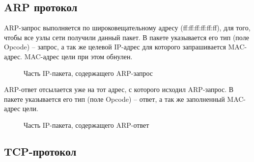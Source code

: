 \documentclass[a4paper, 14pt,russian]{article}
\begin{document}
\subsection{ARP протокол}
ARP-запрос выполняется по широковещательному адресу (ff:ff:ff:ff:ff:ff), для того, чтобы все узлы сети получили данный пакет. В пакете указывается его тип (поле Opcode) – запрос, а так же целевой IP-адрес для которого запрашивается MAC-адрес. MAC-адрес цели при этом обнулен.
\begin{figure}[h!]
	\caption{Часть IP-пакета, содержащего ARP-запрос}
	\label{img:arp_req}
\end{figure}

\newpage
ARP-ответ отсылается уже на тот адрес, с которого исходил ARP-запрос. В пакете указывается его тип (поле Opcode) – ответ, а так же заполненный MAC-адрес цели.
\begin{figure}[h!]
	\caption{Часть IP-пакета, содержащего ARP-ответ}
	\label{img:arp_answ}
\end{figure}

\subsection{TCP-протокол}
\end{document}
